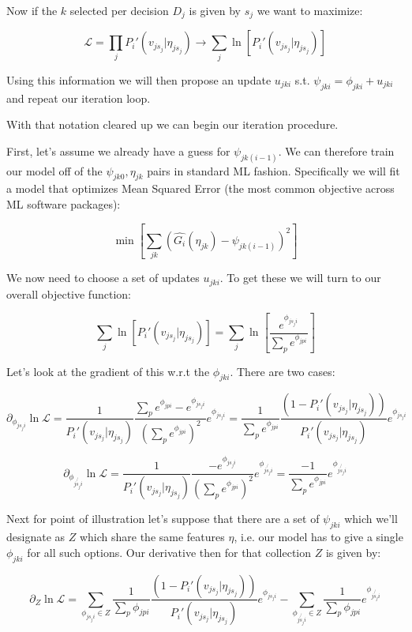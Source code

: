 \documentclass[11pt]{article}
\begin{document}
Now if the $k$ selected per decision $D_j$ is given by $s_j$ we want to maximize:

$$\mathcal{L}=\prod_j P_i'(v_{js_j} | \eta_{js_j})\rightarrow \sum_j \ln{\left[ P_i'(v_{js_j} | \eta_{js_j}) \right]}$$

Using this information we will then propose an update $u_{jki}$ s.t. $\psi_{jki}=\phi_{jki} + u_{jki}$ and repeat our iteration loop. 

With that notation cleared up we can begin our iteration procedure. \newline

First, let's assume we already have a guess for $\psi_{jk(i-1)}$. We can therefore train our model off of the $\psi_{jk0},\eta_{jk}$ pairs in standard ML fashion. Specifically we will fit a model that optimizes Mean Squared Error (the most common objective across ML software packages):

$$\min{\left[ \sum_{jk}\left(\hat{G_i}(\eta_{jk}) - \psi_{jk(i-1)}\right)^2 \right]}$$

We now need to choose a set of updates $u_{jki}$. To get these we will turn to our overall objective function:

$$\sum_j \ln{\left[ P_i'(v_{js_j} | \eta_{js_j}) \right]}= \sum_j \ln{\left[ \frac{e^{\phi_{js_ji}}}{\sum_p e^{\phi_{jpi}}} \right]}$$

Let's look at the gradient of this w.r.t the $\phi_{jki}$. There are two cases:

$$\partial_{\phi_{js_ji}}\ln{\mathcal{L}}
=
\frac{1}{P_i'(v_{js_j} | \eta_{js_j})}\frac{\sum_p e^{\phi_{jpi}}-e^{\phi_{js_ji}}}{\left( \sum_p e^{\phi_{jpi}} \right)^2} e^{\phi_{js_ji}}
=
\frac{1}{\sum_p e^{\phi_{jpi}}}\frac{\left(1-P_i'(v_{js_j} | \eta_{js_j}) \right)}{P_i'(v_{js_j} | \eta_{js_j})} e^{\phi_{js_ji}}$$ 

$$\partial_{\phi_{j\not{s_j}i}}\ln{\mathcal{L}}
=
\frac{1}{P_i'(v_{js_j} | \eta_{js_j})}\frac{-e^{\phi_{js_ji}}}{\left( \sum_p e^{\phi_{jpi}} \right)^2} e^{\phi_{j\not{s_j}i}}
= 
\frac{-1 }{\sum_p e^{\phi_{jpi}}}e^{\phi_{j\not{s_j}i}}$$ 

Next for point of illustration let's suppose that there are a set of $\psi_{jki}$ which we'll designate as $Z$ which share the same features $\eta$, i.e. our model has to give a single $\phi_{jki}$ for all such options. Our derivative then for that collection $Z$ is given by:

$$\partial_Z \ln{\mathcal{L}}=\sum_{\phi_{js_ji} \in Z}\frac{1}{\sum_p \phi_{jpi}}\frac{\left(1-P_i'(v_{js_j} | \eta_{js_j}) \right)}{P_i'(v_{js_j} | \eta_{js_j})}e^{\phi_{js_ji}}-\sum_{\phi_{j\not{s_j}i}\in Z}\frac{1 }{\sum_p \phi_{jpi}}e^{\phi_{j\not{s_j}i}}$$
\end{document}
